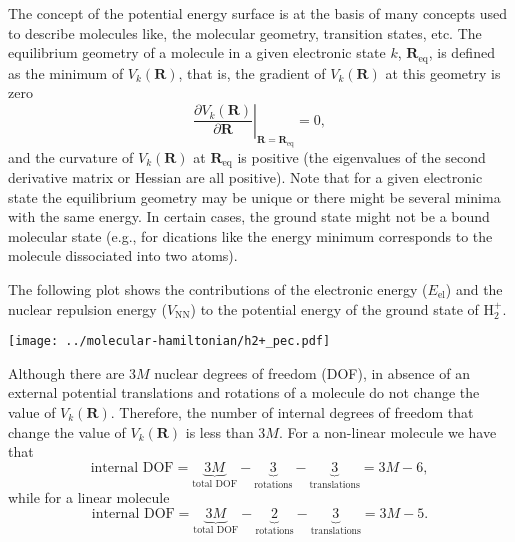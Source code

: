 \documentclass[../Main/chem532-notes.tex]{subfiles}
\begin{document}
The concept of the potential energy surface is at the basis of many concepts used to describe molecules like, the molecular geometry, transition states, etc.
The equilibrium geometry of a molecule in a given electronic state $k$, $\mathbf{R}_\mathrm{eq}$, is defined as the minimum of $V_{k}(\mathbf{R})$, that is, the gradient of $V_{k}(\mathbf{R})$ at this geometry is zero
\begin{equation}
\left. \frac{\partial V_{k}(\mathbf{R})}{\partial \mathbf{R}} \right|_{\mathbf{R}= \mathbf{R}_\mathrm{eq}}= 0,
\end{equation}
and the curvature of $V_{k}(\mathbf{R})$ at $\mathbf{R}_\mathrm{eq}$ is positive (the eigenvalues of the second derivative matrix or Hessian are all positive).
Note that for a given electronic state the equilibrium geometry may be unique or there might be several minima with the same energy.
In certain cases, the ground state might not be a bound molecular state (e.g., for dications like  the energy minimum corresponds to the molecule dissociated into two  atoms).

\begin{example}
The following plot shows the contributions of the electronic energy ($E_\mathrm{el}$) and the nuclear repulsion energy ($V_\mathrm{NN}$) to the potential energy of the ground state of H$_2^+$.
\begin{center}
\texttt{[image: ../molecular-hamiltonian/h2+\_pec.pdf]}
\end{center}
\end{example}

Although there are $3M$ nuclear degrees of freedom (DOF), in absence of an external potential translations and rotations of a molecule do not change the value of $V_{k}(\mathbf{R})$. Therefore, the number of internal degrees of freedom that change the value of $V_{k}(\mathbf{R})$ is less than $3M$. For a non-linear molecule we have that
\begin{equation}
\text{internal DOF} = \underbrace{3 M}_{\text{total DOF}}
-\underbrace{3}_{\text{rotations}}
-\underbrace{3}_{\text{translations}} = 3M - 6,
\end{equation}
while for a linear molecule
\begin{equation}
\text{internal DOF} = \underbrace{3 M}_{\text{total DOF}}
-\underbrace{2}_{\text{rotations}}
-\underbrace{3}_{\text{translations}} =  3M - 5.
\end{equation}
\end{document}
